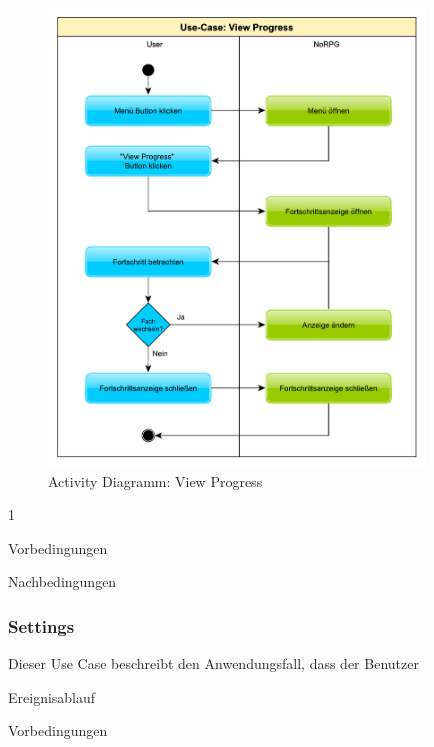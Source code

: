 			\begin{figure}[htbp]
				\centering 
				\label{umlViewProgess}
				\includegraphics[width=10cm]{pics/ViewProgress.pdf}
				\caption{Activity Diagramm: View Progress}
			\end{figure}1
	
			Vorbedingungen
			
			Nachbedingungen
	
		\subsubsection{Settings}
			Dieser Use Case beschreibt den Anwendungsfall, dass der Benutzer 
			
			Ereignisablauf
	
			Vorbedingungen
			
